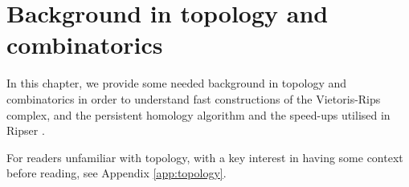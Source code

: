 \chapter{Background in topology and combinatorics}
\label{cha:background}

In this chapter, we provide some needed background in topology and combinatorics in order to understand fast constructions of the Vietoris-Rips complex, and the persistent homology algorithm and the speed-ups utilised in Ripser \cite{bauer2021ripser}.

For readers unfamiliar with topology, with a key interest in having some context before reading, see Appendix \ref{app:topology}.


